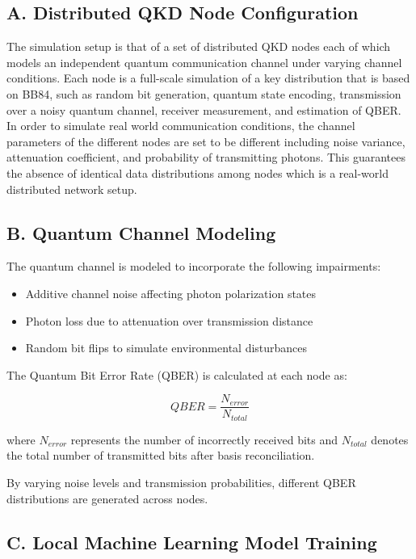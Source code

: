 \documentclass[conference]{IEEEtran}
\begin{document}
\subsection*{A. Distributed QKD Node Configuration}
The simulation setup is that of a set of distributed QKD nodes each of which models an independent quantum communication channel under varying channel conditions. Each node is a full-scale simulation of a key distribution that is based on BB84, such as random bit generation, quantum state encoding, transmission over a noisy quantum channel, receiver measurement, and estimation of QBER. 
In order to simulate real world communication conditions, the channel parameters of the different nodes are set to be different including noise variance, attenuation coefficient, and probability of transmitting photons. This guarantees the absence of identical data distributions among nodes which is a real-world distributed network setup. 

\subsection*{B. Quantum Channel Modeling}

The quantum channel is modeled to incorporate the following impairments:

\begin{itemize}
\item Additive channel noise affecting photon polarization states
\item Photon loss due to attenuation over transmission distance
\item Random bit flips to simulate environmental disturbances
\end{itemize}

The Quantum Bit Error Rate (QBER) is calculated at each node as:

\[
QBER = \frac{N_{error}}{N_{total}}
\]

where $N_{error}$ represents the number of incorrectly received bits and $N_{total}$ denotes the total number of transmitted bits after basis reconciliation.

By varying noise levels and transmission probabilities, different QBER distributions are generated across nodes.

\subsection*{C. Local Machine Learning Model Training}
\end{document}
